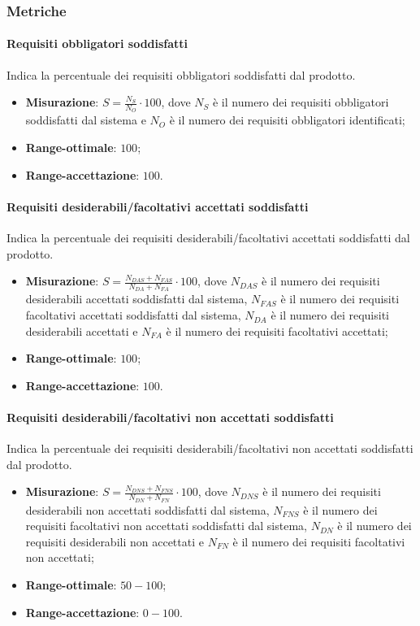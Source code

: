 \subsubsection{Metriche}
\paragraph{Requisiti obbligatori soddisfatti}
\label{reqObbSodd}
Indica la percentuale dei requisiti obbligatori soddisfatti dal prodotto.
\begin{itemize}
\item \textbf{Misurazione}: $S=\frac{N_{S}}{N_{O}} \cdot 100$, dove $N_{S}$ è il numero dei requisiti obbligatori soddisfatti dal sistema e $N_{O}$ è il numero dei requisiti obbligatori identificati;
\item \textbf{Range-ottimale}: $100$;
\item \textbf{Range-accettazione}: $100$.
\end{itemize}
\paragraph{Requisiti desiderabili/facoltativi accettati soddisfatti}
\label{reqAccSodd}
Indica la percentuale dei requisiti desiderabili/facoltativi accettati soddisfatti dal prodotto.
\begin{itemize}
\item \textbf{Misurazione}: $S=\frac{N_{DAS}+N_{FAS}}{N_{DA}+N_{FA}} \cdot 100$, dove $N_{DAS}$ è il numero dei requisiti desiderabili accettati soddisfatti dal sistema, $N_{FAS}$ è il numero dei requisiti facoltativi accettati soddisfatti dal sistema, $N_{DA}$ è il numero dei requisiti desiderabili accettati e $N_{FA}$ è il numero dei requisiti facoltativi accettati;
\item \textbf{Range-ottimale}: $100$;
\item \textbf{Range-accettazione}: $100$.
\end{itemize}
\paragraph{Requisiti desiderabili/facoltativi non accettati soddisfatti}
\label{reqNonAccSodd}
Indica la percentuale dei requisiti desiderabili/facoltativi non accettati soddisfatti dal prodotto.
\begin{itemize}
\item \textbf{Misurazione}: $S=\frac{N_{DNS}+N_{FNS}}{N_{DN}+N_{FN}} \cdot 100$, dove $N_{DNS}$ è il numero dei requisiti desiderabili non accettati soddisfatti dal sistema, $N_{FNS}$ è il numero dei requisiti facoltativi non accettati soddisfatti dal sistema, $N_{DN}$ è il numero dei requisiti desiderabili non accettati e $N_{FN}$ è il numero dei requisiti facoltativi non accettati;
\item \textbf{Range-ottimale}: $50 - 100$;
\item \textbf{Range-accettazione}: $0 - 100$.
\end{itemize}
